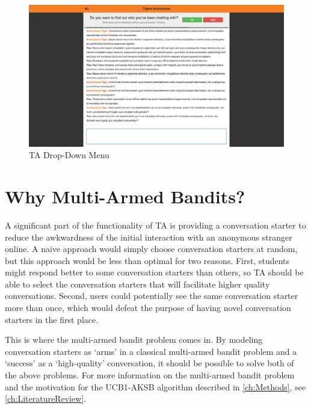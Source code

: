 \begin{figure}[h]
\centering
\includegraphics[trim= 120mm 0mm 120mm 0mm, clip, scale=0.36]{./Figures/FullChatDropDown}
\caption{TA Drop-Down Menu}
\label{fig:DropDownMenu}
\end{figure}

\section{Why Multi-Armed Bandits?}
\label{sec:WhyMultiArmedBandits}
A significant part of the functionality of TA is providing a conversation starter to reduce the awkwardness of the initial interaction with an anonymous stranger online. A naive approach would simply choose conversation starters at random, but this approach would be less than optimal for two reasons. First, students might respond better to some conversation starters than others, so TA should be able to select the conversation starters that will facilitate higher quality conversations. Second, users could potentially see the same conversation starter more than once, which would defeat the purpose of having novel conversation starters in the first place.

This is where the multi-armed bandit problem comes in. By modeling conversation starters as `arms' in a classical multi-armed bandit problem and a `success' as a `high-quality' conversation, it should be possible to solve both of the above problems. For more information on the multi-armed bandit problem and the motivation for the UCB1-AKSB algorithm described in \autoref{ch:Methods}, see \autoref{ch:LiteratureReview}.

